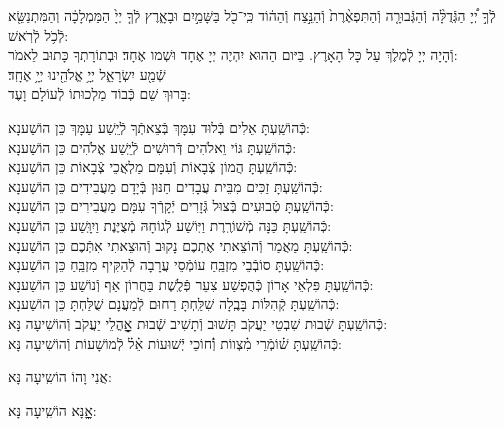 \documentclass[twoside, openany, parskip=half, 11pt]{book}
\begin{document}
לְֿךָ֣ יְ֠יָ הַגְּֿדֻלָּ֨ה וְֿהַגְּֿבוּרָ֤ה וְֿהַתִּפְאֶ֨רֶת֙ וְֿהַנֵּ֣צַח וְֿהַה֔וֹד
כִּֽי־כֹ֖ל בַּשָּׁמַ֣יִם וּבָאָ֑רֶץ לְֿךָ֤ יְיָ֙ הַמַּמְלָכָ֔ה
וְהַמִּתְנַשֵּׂ֖א לְֿכֹ֥ל לְֿרֹֽאשׁ:\\
וְֿהָיָה יְיָ לְֿמֶלֶךְ עַל כָּל הָאָרֶץ. בַּיּום הַהוּא יִהְיֶה יְיָ אֶחָד וּשְׁמו אֶחָד׃ וּבְתוֹרָתְךָ כָּתוּב לֵאמֹר: \\
שְֿׁמַ֖ע יִשְׂרָאֵ֑ל יְיָ֥ אֱלֹהֵ֖ינוּ יְיָ֥ אֶחָֽד׃\\
בָּרוּךְ שֵׁם כְּֿבוֹד מַלְכוּתוֹ לְֿעוֹלָם וָעֶד:

\begin{small}
	כְּֿהוֹשַֽׁעְתָּ אֵלִים בְּֿלוּד עִמָּךְ בְּֿצֵאתְֿךָ לְֿיֵֽשַׁע עַמָּךְ \hfill כֵּן הוֹשַׁענָא: \\
	כְּֿהוֹשַֽׁעְתָּ גּוֹי וֵאלֹהִים דְּֿרוּשִׁים לְֿיֵֽשַׁע אֱלֹהִים \hfill כֵּן הוֹשַׁענָא: \\
	כְּֿהוֹשַֽׁעְתָּ הֲמוֹן צְֿבָאוֹת וְֿעִמָּם מַלְאֲכֵי צְֿבָאוֹת \hfill כֵּן הוֹשַׁענָא: \\
	כְּֿהוֹשַֽׁעְתָּ זַכִּים מִבֵּית עֲבָדִים חַנּוּן בְּֿיָדָם מַעֲבִידִים \hfill כֵּן הוֹשַׁענָא: \\
	כְּֿהוֹשַֽׁעְתָּ טְֿבוּעִים בְּֿצוּל גְּֿזָרִים יְֿקָרְֿךָ עִמָּם מַעֲבִירִים \hfill כֵּן הוֹשַׁענָא: \\
	כְּֿהוֹשַֽׁעְתָּ כַּנָּה מְֿשׁוֹרֶֽרֶת וַיּֽוֹשַׁע לְֿגוֹחָהּ מְֿצֻיֶּנֶת וַיִוָּֽשַׁע \hfill כֵּן הוֹשַׁענָא: \\
	כְּֿהוֹשַֽׁעְתָּ מַאֲמַר וְֿהוֹצֵאתִי אֶתְכֶם נָקוּב וְֿהוּצֵאתִי אִתְּֿכֶם \hfill כֵּן הוֹשַׁענָא:\\
	כְּֿהוֹשַֽׁעְתָּ סוֹבְֿבֵי מִזְבֵּֽחַ עוֹמְֿסֵי עֲרָבָה לְֿהַקִּיף מִזְבֵּֽחַ \hfill כֵּן הוֹשַׁענָא: \\
	כְּֿהוֹשַֽׁעְתָּ פִּלְאֵי אָרוֹן כְּֿהֻפְשַׁע צִעֵר פְּֿלֶֽשֶׁת בַּחֲרוֹן אַף וְֿנוֹשַׁע \hfill כֵּן הוֹשַׁענָא: \\
	כְּֿהוֹשַֽׁעְתָּ קְֿהִלּוֹת בָּבֶֽלָה שִׁלַּֽחְתָּ רַחוּם לְֿמַעֲנָם שֻׁלַּחְתָּ \hfill כֵּן הוֹשַׁענָא:\\
	כְּֿהוֹשַֽׁעְתָּ שְֿׁבוּת שִׁבְטֵי יַעֲקֹב תָּשׁוּב וְֿתָשִׁיב שְֿׁבוּת אׇׇׇׇׇׇׇׇָהֳלֵי יַעֲקֹב \hfill וְֿהוֹשִׁיעָה נָּא:\\
	כְּֿהוֹשַֽׁעְתָּ שׁ֗וֹמְֿרֵי מִ֗צְווֹת וְֿ֗חוֹכֵי יְֿשׁוּעוֹת אֵ֗ל֗ לְֿמוֹשָׁעוֹת \hfill וְֿהוֹשִׁיעָה נָּא:
	
\end{small}

\begin{large}
	\chazzan
	אֲנִי וָהוֹ הוֹשִֽיעָה נָּא:
	
	\shatzvkahal
	אׇׇׇׇָנָּא הוֹשִֽׁיעָה נָּא:
	
\end{large}
\end{document}
